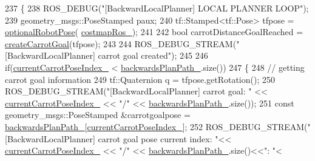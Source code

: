 \begin{DoxyCode}
237         \{
238             ROS\_DEBUG(\textcolor{stringliteral}{"[BackwardLocalPlanner] LOCAL PLANNER LOOP"});
239             geometry\_msgs::PoseStamped paux;
240             tf::Stamped<tf::Pose> tfpose = \hyperlink{namespacecl__move__base__z_1_1backward__local__planner_afd5bb2a0d144f7b89f4215fbcb1fbe69}{optionalRobotPose}(
      \hyperlink{classcl__move__base__z_1_1backward__local__planner_1_1BackwardLocalPlanner_a4136268882a105d9e06e173d85d5c0dc}{costmapRos\_});
241 
242             \textcolor{keywordtype}{bool} carrotDistanceGoalReached = \hyperlink{classcl__move__base__z_1_1backward__local__planner_1_1BackwardLocalPlanner_a786337a838e58b38b724bc342cf76e10}{createCarrotGoal}(tfpose);
243 
244             ROS\_DEBUG\_STREAM(\textcolor{stringliteral}{"[BackwardLocalPlanner] carrot goal created"});
245 
246             \textcolor{keywordflow}{if}(\hyperlink{classcl__move__base__z_1_1backward__local__planner_1_1BackwardLocalPlanner_a2e8f2b78bc97f27c5fa431f3af2261ed}{currentCarrotPoseIndex\_} < 
      \hyperlink{classcl__move__base__z_1_1backward__local__planner_1_1BackwardLocalPlanner_ad9cde5c85f782cab2ddb4030e3c3f2cf}{backwardsPlanPath\_}.size())
247             \{
248                 \textcolor{comment}{// getting carrot goal information}
249                 tf::Quaternion q = tfpose.getRotation();
250                 ROS\_DEBUG\_STREAM(\textcolor{stringliteral}{"[BackwardLocalPlanner] carrot goal: "} << 
      \hyperlink{classcl__move__base__z_1_1backward__local__planner_1_1BackwardLocalPlanner_a2e8f2b78bc97f27c5fa431f3af2261ed}{currentCarrotPoseIndex\_} << \textcolor{stringliteral}{"/"}  << \hyperlink{classcl__move__base__z_1_1backward__local__planner_1_1BackwardLocalPlanner_ad9cde5c85f782cab2ddb4030e3c3f2cf}{backwardsPlanPath\_}.size());
251                 \textcolor{keyword}{const} geometry\_msgs::PoseStamped &carrotgoalpose = 
      \hyperlink{classcl__move__base__z_1_1backward__local__planner_1_1BackwardLocalPlanner_ad9cde5c85f782cab2ddb4030e3c3f2cf}{backwardsPlanPath\_}[\hyperlink{classcl__move__base__z_1_1backward__local__planner_1_1BackwardLocalPlanner_a2e8f2b78bc97f27c5fa431f3af2261ed}{currentCarrotPoseIndex\_}];
252                 ROS\_DEBUG\_STREAM(\textcolor{stringliteral}{"[BackwardLocalPlanner] carrot goal pose current index: "}<< 
      \hyperlink{classcl__move__base__z_1_1backward__local__planner_1_1BackwardLocalPlanner_a2e8f2b78bc97f27c5fa431f3af2261ed}{currentCarrotPoseIndex\_} << \textcolor{stringliteral}{"/"} << \hyperlink{classcl__move__base__z_1_1backward__local__planner_1_1BackwardLocalPlanner_ad9cde5c85f782cab2ddb4030e3c3f2cf}{backwardsPlanPath\_}.size()<<\textcolor{stringliteral}{": "}<

\end{DoxyCode}
